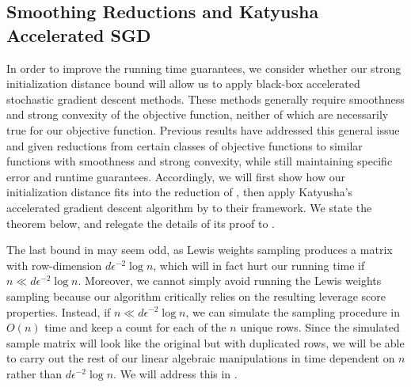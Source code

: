 \subsection{Smoothing Reductions and Katyusha Accelerated SGD}
\label{subsec:katyusha}
In order to improve the running time guarantees, we consider whether our strong initialization distance bound will allow us to apply black-box accelerated stochastic gradient descent methods. These methods generally require smoothness and strong convexity of the objective function, neither of which are necessarily true for our objective function. Previous results \citep{Nesterov05smooth, Nesterov07, DuchiBW12, OuyangG12, AllenZhuH16} have addressed this general issue and given reductions from certain classes of objective functions to similar functions with smoothness and strong convexity, while still maintaining specific error and runtime guarantees. Accordingly, we will first show how our initialization distance fits into the reduction of \cite{AllenZhuH16}, then apply Katyusha's accelerated gradient descent algorithm by \cite{AllenZhu17} to their framework. 
We state the theorem below, and relegate the details of its proof to .

\applyKatyusha*

The last bound in  may seem odd, as Lewis weights sampling produces a matrix with row-dimension $d\epsilon^{-2}\log{n}$, which will in fact hurt our running time if $n \ll d\epsilon^{-2}\log{n}$. Moreover, we cannot simply avoid running the Lewis weights sampling because our algorithm critically relies on the resulting leverage score properties.
Instead, if $n \ll d\epsilon^{-2}\log{n}$, we can simulate the sampling procedure in $O(n)$ time and keep a count for each of the $n$ unique rows. Since the simulated sample matrix will look like the original but with duplicated rows, we will be able to carry out the rest of our linear algebraic manipulations in time dependent on $n$ rather than $d\epsilon^{-2}\log{n}$. %
We will address this in .



%